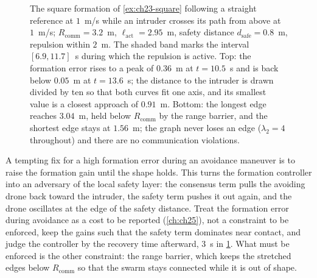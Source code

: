 \begin{figure}[tb]
  \centering
  \caption{The square formation of \cref{ex:ch23-square} following a straight
  reference at $1$~m/s while an intruder crosses its path from above at
  $1$~m/s; $R_{\mathrm{comm}} = 3.2$~m, $\ell_{\mathrm{act}} = 2.95$~m, safety
  distance $d_{\mathrm{safe}} = 0.8$~m, repulsion within $2$~m. The shaded
  band marks the interval $[6.9, 11.7]$~s during which the repulsion is
  active. Top: the formation error rises to a peak of $0.36$~m at
  $t = 10.5$~s and is back below $0.05$~m at $t = 13.6$~s; the distance to the
  intruder is drawn divided by ten so that both curves fit one axis, and its
  smallest value is a closest approach of $0.91$~m. Bottom: the longest edge reaches
  $3.04$~m, held below $R_{\mathrm{comm}}$ by the range barrier, and the
  shortest edge stays at $1.56$~m; the graph never loses an edge
  ($\lambda_2 = 4$ throughout) and there are no communication violations.}
  \label{fig:ch23-avoidance}
\end{figure}

\begin{pitfall}
A tempting fix for a high formation error during an avoidance maneuver is to
raise the formation gain until the shape holds. This turns the formation
controller into an adversary of the local safety layer: the consensus term pulls the
avoiding drone back toward the intruder, the safety term pushes it out again,
and the drone oscillates at the edge of the safety distance. Treat the
formation error during avoidance as a cost to be reported (\cref{ch:ch25}),
not a constraint to be enforced, keep the gains such that the safety term
dominates near contact, and judge the controller by the recovery time
afterward, $3$~s in \cref{fig:ch23-avoidance}. What must be enforced is the
other constraint: the range barrier, which keeps the stretched edges below
$R_{\mathrm{comm}}$ so that the swarm stays connected while it is out of
shape.
\end{pitfall}

